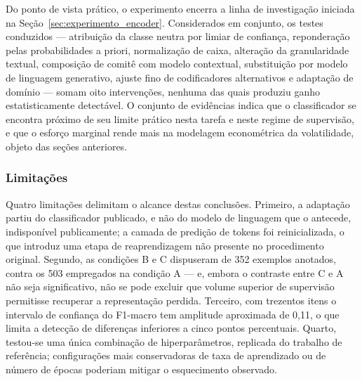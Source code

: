 Do ponto de vista prático, o experimento encerra a linha de investigação iniciada na
Seção~\ref{sec:experimento_encoder}. Considerados em conjunto, os testes conduzidos --- atribuição
da classe neutra por limiar de confiança, reponderação pelas probabilidades a priori, normalização
de caixa, alteração da granularidade textual, composição de comitê com modelo contextual,
substituição por modelo de linguagem generativo, ajuste fino de codificadores alternativos e
adaptação de domínio --- somam oito intervenções, nenhuma das quais produziu ganho estatisticamente
detectável. O conjunto de evidências indica que o classificador se encontra próximo de seu limite
prático nesta tarefa e neste regime de supervisão, e que o esforço marginal rende mais na
modelagem econométrica da volatilidade, objeto das seções anteriores.

\subsubsection{Limitações}

Quatro limitações delimitam o alcance destas conclusões. Primeiro, a adaptação partiu do
classificador publicado, e não do modelo de linguagem que o antecede, indisponível publicamente; a
camada de predição de tokens foi reinicializada, o que introduz uma etapa de reaprendizagem não
presente no procedimento original. Segundo, as condições B e C dispuseram de 352 exemplos anotados,
contra os 503 empregados na condição A --- e, embora o contraste entre C e A não seja
significativo, não se pode excluir que volume superior de supervisão permitisse recuperar a
representação perdida. Terceiro, com trezentos itens o intervalo de confiança do F1-macro tem
amplitude aproximada de 0,11, o que limita a detecção de diferenças inferiores a cinco pontos
percentuais. Quarto, testou-se uma única combinação de hiperparâmetros, replicada do trabalho de
referência; configurações mais conservadoras de taxa de aprendizado ou de número de épocas
poderiam mitigar o esquecimento observado.
